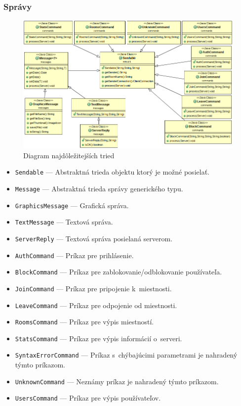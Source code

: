 \documentclass[11pt]{article}
\begin{document}
\subsubsection{Správy}
\begin{figure}[h]
	\includegraphics[width=\textwidth]{UML-msg.png}
	\caption{Diagram najdôležitejších tried}
\end{figure}

\begin{itemize}
	\item \texttt{Sendable} --- Abstraktná trieda objektu ktorý je možné
	      posielať.
	\item \texttt{Message} --- Abstraktná trieda správy generického typu.
	\item \texttt{GraphicsMessage} --- Grafická správa.
	\item \texttt{TextMessage} --- Textová správa.
	\item \texttt{ServerReply} --- Textová správa posielaná serverom.
	\item \texttt{AuthCommand} --- Príkaz pre prihlásenie.
	\item \texttt{BlockCommand} --- Príkaz pre zablokovanie/odblokovanie
	      používateľa.
	\item \texttt{JoinCommand} --- Príkaz pre pripojenie k~miestnosti.
	\item \texttt{LeaveCommand} --- Príkaz pre odpojenie od miestnosti.
	\item \texttt{RoomsCommand} --- Príkaz pre výpis miestností.
	\item \texttt{StatsCommand} --- Príkaz pre výpis informácií o~serveri.
	\item \texttt{SyntaxErrorCommand} --- Príkaz s~chýbajúcimi parametrami je
	      nahradený týmto príkazom.
	\item \texttt{UnknownCommand} --- Neznámy príkaz je nahradený týmto
	      príkazom.
	\item \texttt{UsersCommand} --- Príkaz pre výpis používateľov.
\end{itemize}
\end{document}
